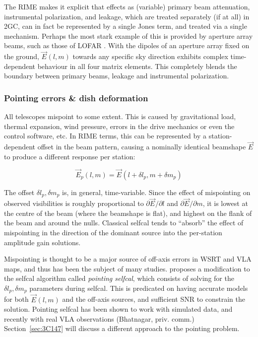 \documentclass[]{aa}
\newcommand{\jones}[2]{\vec {#1}_{#2}}
\begin{document}
The RIME makes it explicit that effects as (variable) primary beam attenuation, instrumental polarization, and leakage, which are treated separately (if at all) in 2GC, can in fact be represented by a single Jones term, and treated via a single mechanism. Perhaps the most stark example of this is provided by aperture array beams, such as those of LOFAR \citep{Yatawatta:LOFAR-beam}. With the dipoles of an aperture array fixed on the ground, 
$\jones{E}{}(l,m)$ towards any specific sky direction exhibits complex time-dependent behaviour in all four matrix elements. This completely blends the boundary between primary beams, leakage and instrumental polarization.

\subsubsection{Pointing errors \& dish deformation\label{sec:pointing}}

All telescopes mispoint to some extent. This is caused by gravitational load, thermal expansion, wind pressure, errors in the drive mechanics or even the control software, etc. In RIME terms, this can be represented by a station-dependent offset in the beam pattern, causing a nominally identical beamshape $\jones{E}{}$ to produce a different response per station:

\begin{equation}\label{eq:mispointing}
\jones{E}{p}(l,m) = \jones{E}{}(l+\delta l_p,m+\delta m_p)
\end{equation}

The offset $\delta l_p,\delta m_p$ is, in general, time-variable. Since the effect of mispointing on observed visibilities is roughly proportional to $\partial\jones{E}{}/\partial l$ and $\partial \jones{E}{}/\partial m$, it is lowest at the centre of the beam (where the beamshape is flat), and highest on the flank of the beam and around the nulls. Classical selfcal tends to  ``absorb'' the effect of mispointing in the direction of the dominant source
into the per-station amplitude gain solutions. 

Mispointing is thought to be a major source of off-axis errors in WSRT and VLA maps, and thus has been the subject of many studies. \citet{SB:pointing} proposes a modification to the selfcal algorithm called {\em pointing selfcal}, which consists of solving for the $\delta l_p,\delta m_p$ parameters during selfcal. This is predicated on having accurate models for both $\jones{E}{}(l,m)$ and the off-axis sources, and sufficient SNR to constrain the solution. Pointing selfcal has been shown to work with simulated data, and recently with real VLA observations (Bhatnagar, priv. comm.) Section~\ref{sec:3C147} will discuss a different approach to the pointing problem.
\end{document}
